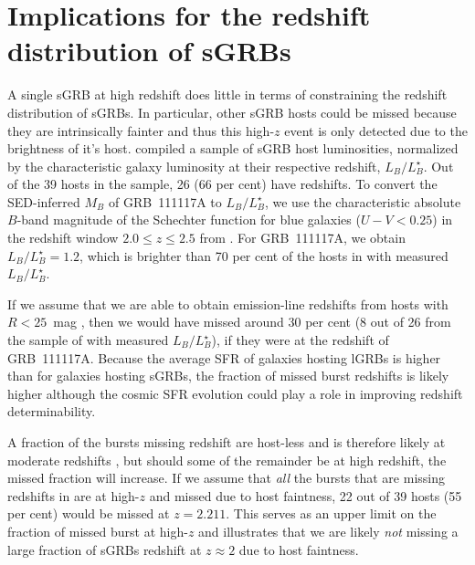 \documentclass{aa}    %
\begin{document}
\section{Implications for the redshift distribution of sGRBs}

A single sGRB at high redshift does little in terms of constraining the redshift
distribution of sGRBs. In particular, other sGRB hosts could be missed because
they are intrinsically fainter and thus this high-$z$ event is only detected due
to the brightness of it's host. \citet{Berger2014} compiled a sample of sGRB
host luminosities, normalized by the characteristic galaxy luminosity at their
respective redshift, $L_B/L^{\star}_{B}$. Out of the 39 hosts in the sample, 26
(66 per cent) have redshifts. To convert the SED-inferred $M_B$ of GRB~111117A
to $L_B/L^{\star}_{B}$, we use the characteristic absolute $B$-band magnitude of
the Schechter function for blue galaxies ($U - V < 0.25$) in the redshift window
$2.0 \leq z \leq 2.5$ from \citet{Marchesini2007}. For GRB~111117A, we obtain
$L_B/L^{\star}_{B} = 1.2$, which is brighter than 70 per cent of the hosts in
\citet{Berger2014} with measured $L_B/L^{\star}_{B}$.

If we assume that we are able to obtain emission-line redshifts from hosts with
$R < 25$~mag \citep{Kruhler2012}, then we would have missed around 30 per cent
(8 out of 26 from the sample of \citealt{Berger2014} with measured
$L_B/L^{\star}_{B}$), if they were at the redshift of GRB~111117A. Because the
average SFR of galaxies hosting lGRBs is higher than for galaxies hosting sGRBs,
the fraction of missed burst redshifts is likely higher although the cosmic SFR
evolution could play a role in improving redshift determinability.

A fraction of the bursts missing redshift are host-less and is therefore likely
at moderate redshifts \citep{Tunnicliffe2014}, but should some of the remainder
be at high redshift, the missed fraction will increase. If we assume that
\textit{all} the bursts that are missing redshifts in \citet{Berger2014} are at
high-$z$ and missed due to host faintness, 22 out of 39 hosts (55 per cent)
would be missed at $z = 2.211$. This serves as an upper limit on the fraction of
missed burst at high-$z$ and illustrates that we are likely \textit{not} missing a
large fraction of sGRBs redshift at $z \approx 2$ due to host faintness.
\end{document}
